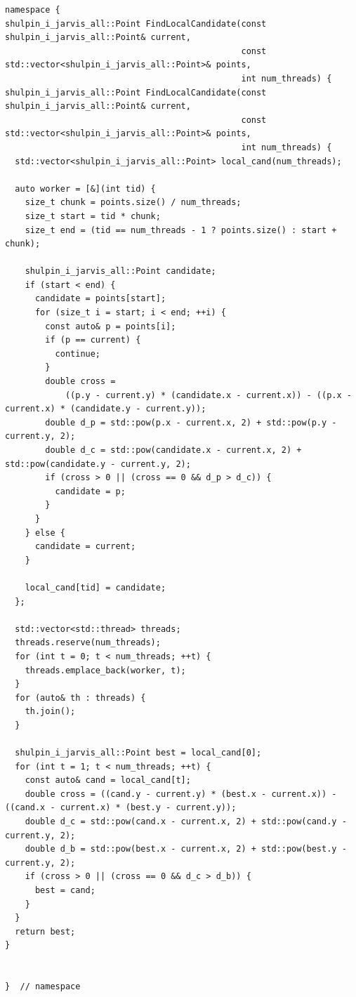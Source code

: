 \documentclass[12pt,a4paper]{article}
\begin{document}
\begin{lstlisting}[caption={Гибридная версия алгоритма(MPI+STL)}]
namespace {
shulpin_i_jarvis_all::Point FindLocalCandidate(const shulpin_i_jarvis_all::Point& current,
                                               const std::vector<shulpin_i_jarvis_all::Point>& points,
                                               int num_threads) {
shulpin_i_jarvis_all::Point FindLocalCandidate(const shulpin_i_jarvis_all::Point& current,
                                               const std::vector<shulpin_i_jarvis_all::Point>& points,
                                               int num_threads) {
  std::vector<shulpin_i_jarvis_all::Point> local_cand(num_threads);

  auto worker = [&](int tid) {
    size_t chunk = points.size() / num_threads;
    size_t start = tid * chunk;
    size_t end = (tid == num_threads - 1 ? points.size() : start + chunk);

    shulpin_i_jarvis_all::Point candidate;
    if (start < end) {
      candidate = points[start];
      for (size_t i = start; i < end; ++i) {
        const auto& p = points[i];
        if (p == current) {
          continue;
        }
        double cross =
            ((p.y - current.y) * (candidate.x - current.x)) - ((p.x - current.x) * (candidate.y - current.y));
        double d_p = std::pow(p.x - current.x, 2) + std::pow(p.y - current.y, 2);
        double d_c = std::pow(candidate.x - current.x, 2) + std::pow(candidate.y - current.y, 2);
        if (cross > 0 || (cross == 0 && d_p > d_c)) {
          candidate = p;
        }
      }
    } else {
      candidate = current;
    }

    local_cand[tid] = candidate;
  };

  std::vector<std::thread> threads;
  threads.reserve(num_threads);
  for (int t = 0; t < num_threads; ++t) {
    threads.emplace_back(worker, t);
  }
  for (auto& th : threads) {
    th.join();
  }

  shulpin_i_jarvis_all::Point best = local_cand[0];
  for (int t = 1; t < num_threads; ++t) {
    const auto& cand = local_cand[t];
    double cross = ((cand.y - current.y) * (best.x - current.x)) - ((cand.x - current.x) * (best.y - current.y));
    double d_c = std::pow(cand.x - current.x, 2) + std::pow(cand.y - current.y, 2);
    double d_b = std::pow(best.x - current.x, 2) + std::pow(best.y - current.y, 2);
    if (cross > 0 || (cross == 0 && d_c > d_b)) {
      best = cand;
    }
  }
  return best;
}


}  // namespace


\end{lstlisting}
\end{document}
